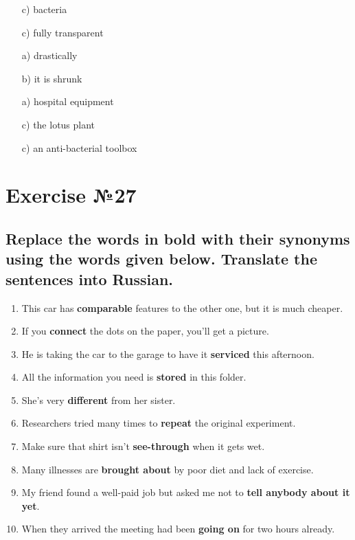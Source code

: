 \begin{enumerate}
      \item[c)] bacteria
      \item[c)] fully transparent
      \item[a)] drastically
      \item[b)] it is shrunk
      \item[a)] hospital equipment
      \item[c)] the lotus plant
      \item[c)] an anti-bacterial toolbox
\end{enumerate}

\section{Exercise №27}
\subsection*{Replace the words in bold with their synonyms using the words given below. Translate the sentences into Russian.}
\begin{enumerate}
      \item This car has \textbf{comparable} features to the other one, but it is much cheaper.
      \item If you \textbf{connect} the dots on the paper, you'll get a picture.
      \item He is taking the car to the garage to have it \textbf{serviced} this afternoon.
      \item All the information you need is \textbf{stored} in this folder.
      \item She's very \textbf{different} from her sister.
      \item Researchers tried many times to \textbf{repeat} the original experiment.
      \item Make sure that shirt isn't \textbf{see-through} when it gets wet.
      \item Many illnesses are \textbf{brought about} by poor diet and lack of exercise.
      \item My friend found a well-paid job but asked me not to \textbf{tell anybody about it yet}.
      \item When they arrived the meeting had been \textbf{going on} for two hours already.
\end{enumerate}

